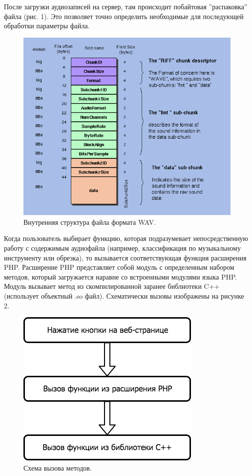 \documentclass[14pt,a4paper]{article}
\begin{document}
После загрузки аудиозаписей на сервер, там происходит побайтовая ''распаковка'' файла (рис. 1). Это позволяет точно определить необходимые для последующей обработки параметры файла.

\begin{figure}[H]
\centering
\includegraphics[scale=0.5]{img/wave_format.png}
\caption{Внутренняя структура файла формата WAV.}
\label{fig:wave_format}
\end{figure}

Когда пользователь выбирает функцию, которая подразумевает непосредственную работу с содержимым аудиофайла (например, классификация по музыкальному инструменту или обрезка), то вызывается соответствующая функция расширения PHP. Расширение PHP представляет собой модуль с определенным набором методов, который загружается наравне со встроенными модулями языка PHP. Модуль вызывает метод из скомпилированной заранее библиотеки C++ (использует объектный .so файл). Схематически вызовы изображены на рисунке 2.

\begin{figure}[H]
\centering
\includegraphics[scale=0.5]{img/diagram.png}
\caption{Схема вызова методов.}
\label{fig:diagram}
\end{figure}
\end{document}
